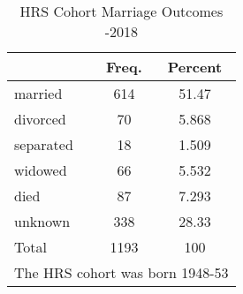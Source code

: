 \begin{table}[htbp]\centering
\def\sym#1{\ifmmode^{#1}\else\(^{#1}\)\fi}
\caption{HRS Cohort Marriage Outcomes -2018}
\begin{tabular}{l*{1}{cc}}
\hline\hline
            &       Freq.&     Percent\\
\hline
married     &         614&       51.47\\
divorced    &          70&       5.868\\
separated   &          18&       1.509\\
widowed     &          66&       5.532\\
died        &          87&       7.293\\
unknown     &         338&       28.33\\
Total       &        1193&         100\\
\hline\hline
\multicolumn{3}{l}{\footnotesize The HRS cohort was born 1948-53}\\
\end{tabular}
\end{table}
